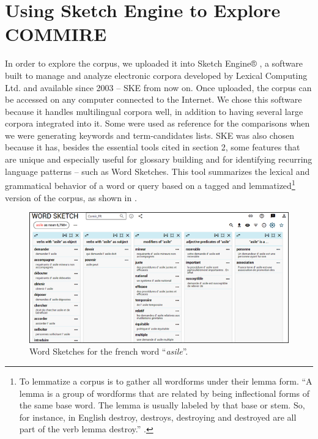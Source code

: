 \documentclass[english]{textolivre}
\begin{document}
\section{Using Sketch Engine to Explore COMMIRE}

In order to explore the corpus, we uploaded it into Sketch Engine® \cite{kilgarriff_sketch_2004}, a software built to manage and analyze electronic corpora developed by Lexical Computing Ltd. and available since 2003 – SKE from now on. Once uploaded, the corpus can be accessed on any computer connected to the Internet. We chose this software because it handles multilingual corpora well, in addition to having several large corpora integrated into it. Some were used as reference for the comparisons when we were generating keywords and term-candidates lists. SKE was also chosen because it has, besides the essential tools cited in section 2, some features that are unique and especially useful for glossary building and for identifying recurring language patterns – such as Word Sketches. This tool summarizes the lexical and grammatical behavior of a word or query based on a tagged and lemmatized\footnote{To lemmatize a corpus is to gather all wordforms under their lemma form. “A lemma is a group of wordforms that are related by being inflectional forms of the same base word. The lemma is usually labeled by that base or stem. So, for instance, in English destroy, destroys, destroying and destroyed are all part of the verb lemma destroy.” \cite[p.~245]{mcenery_corpus_2012}.}  version of the corpus, as shown in .

\begin{figure}[htbp]
\centering
\includegraphics[width=\textwidth]{Figura03.png}
\caption{Word Sketches for the french word “\textit{asile}”.}
\label{Figura03}
\end{figure}
\end{document}
